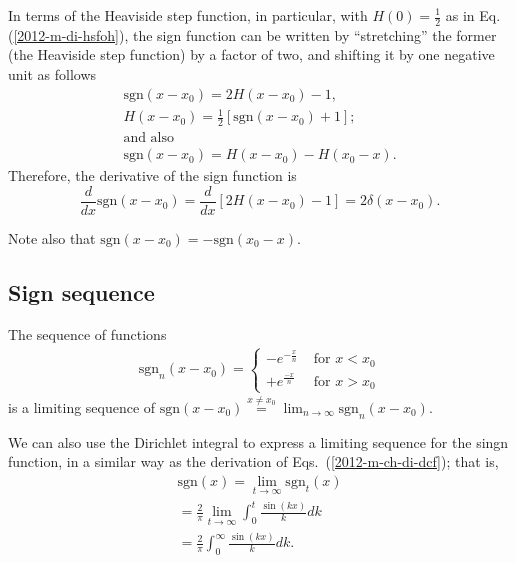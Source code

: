 In terms of  the  Heaviside step function, in particular, with
$H(0)=\frac{1}{2}$ as in Eq. (\ref{2012-m-di-hsfoh}),
the sign function can be written by ``stretching'' the former (the Heaviside step function) by a factor of two,
and shifting it by one negative unit as follows
\begin{equation}
\begin{split}
\textrm{sgn}(x-x_0) = 2H(x-x_0) -1,\\
H(x-x_0) = \frac{1}{2} \left[ \textrm{sgn}(x-x_0)+1\right];  \\
\textrm{and also}\\
\textrm{sgn}(x-x_0) = H(x-x_0) - H(x_0-x).
\end{split}
\label{2011-m-cbhsf}
\end{equation}
Therefore, the derivative of the sign function is
\begin{equation}
\frac{d}{dx}\textrm{sgn}(x-x_0) = \frac{d}{dx} \left[2H(x-x_0) -1\right] =2 \delta(x-x_0).
\end{equation}

Note also that  $\textrm{sgn}(x-x_0) =  - \textrm{sgn}(x_0-x)$.

\subsection{Sign sequence}


The sequence of functions
\begin{equation}
\begin{split}
\textrm{sgn}_n(x-x_0)
=
\left\{
\begin{array}{rl}
- e^{-\frac{x}{n}}&\textrm{ for } x < x_0\\
+ e^{\frac{-x}{n}}&\textrm{ for } x > x_0
\end{array}
\right.
\end{split}
\label{2012-m-ch-di-lsegn}
\end{equation}
is a limiting sequence of
$
\textrm{sgn}(x-x_0)\stackrel{x\neq x_0}{=} \lim_{n\rightarrow \infty} \textrm{sgn}_n(x-x_0)
$.


We can also use the Dirichlet integral
to express a limiting sequence for the singn function,
in a similar way as the derivation of Eqs.~(\ref{2012-m-ch-di-dcf}); that is,
\begin{equation}
\begin{split}
\textrm{sgn}(x)= \lim_{t \rightarrow \infty} \textrm{sgn}_t (x)
\\
= \frac{2}{\pi }\lim_{t \rightarrow \infty}\int_0^t \frac{\sin (kx)}{k} dk
\\
=
\frac{2}{\pi }\int_0^\infty \frac{\sin (kx)}{k} dk
.
\end{split}
\label{2015-m-ch-di-sign}
\end{equation}

